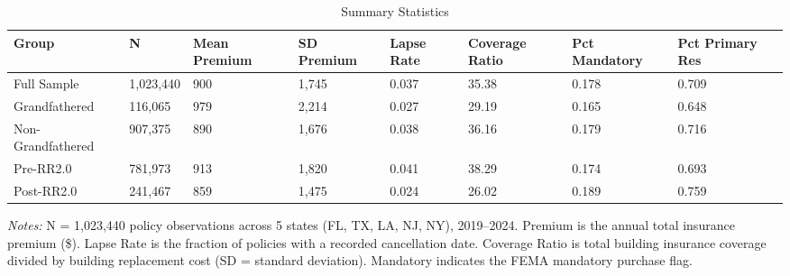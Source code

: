 \begin{table}[H]
\centering
\caption{Summary Statistics}
\label{tab:summary}
\begin{adjustbox}{max width=\textwidth}
\begin{threeparttable}
\begin{tabular}{llllllll}
\toprule
Group & N & Mean Premium & SD Premium & Lapse Rate & Coverage Ratio & Pct Mandatory & Pct Primary Res\\
\midrule
Full Sample & 1,023,440 & 900 & 1,745 & 0.037 & 35.38 & 0.178 & 0.709\\
Grandfathered & 116,065 & 979 & 2,214 & 0.027 & 29.19 & 0.165 & 0.648\\
Non-Grandfathered & 907,375 & 890 & 1,676 & 0.038 & 36.16 & 0.179 & 0.716\\
Pre-RR2.0 & 781,973 & 913 & 1,820 & 0.041 & 38.29 & 0.174 & 0.693\\
Post-RR2.0 & 241,467 & 859 & 1,475 & 0.024 & 26.02 & 0.189 & 0.759\\
\bottomrule
\end{tabular}
\begin{tablenotes}[flushleft]
\small
\item \textit{Notes:} N = 1,023,440 policy observations across 5 states (FL, TX, LA, NJ, NY), 2019--2024. Premium is the annual total insurance premium (\$). Lapse Rate is the fraction of policies with a recorded cancellation date. Coverage Ratio is total building insurance coverage divided by building replacement cost (SD = standard deviation). Mandatory indicates the FEMA mandatory purchase flag.
\end{tablenotes}
\end{threeparttable}
\end{adjustbox}
\end{table}
